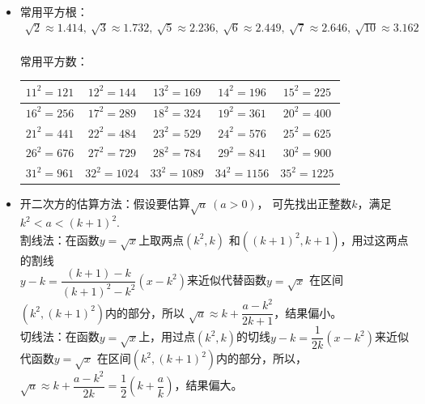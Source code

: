 \begin{itemize}[leftmargin=\inteval{\myitemleftmargin}pt,itemsep=
   \inteval{\myitemitempsep}pt,topsep=\inteval{\myitemtopsep}pt]
\item 常用平方根：
\begin{gather*}
    \sqrt{2}\approx1.414,\ \sqrt{3}\approx1.732,\ \sqrt{5}\approx2.236,\ 
    \sqrt{6}\approx2.449,\ \sqrt{7}\approx2.646,\ \sqrt{10}\approx3.162
\end{gather*}
\\
常用平方数：
\begin{table}[H]
    \centering
    \begin{tabular}{|c|c|c|c|c|}
        \hline
        $ 11^2=121 $ & $ 12^2=144 $ & $ 13^2=169 $ & $ 14^2=196 $ & $ 15^2=225 $\\ \hline
        $ 16^2=256 $ & $ 17^2=289 $ & $ 18^2=324 $ & $ 19^2=361 $ & $ 20^2=400 $\\ \hline
        $ 21^2=441 $ & $ 22^2=484 $ & $ 23^2=529 $ & $ 24^2=576 $ & $ 25^2=625 $\\ \hline
        $ 26^2=676 $ & $ 27^2=729 $ & $ 28^2=784 $ & $ 29^2=841 $ & $ 30^2=900 $\\ \hline
        $ 31^2=961 $ & $ 32^2=1024 $ & $ 33^2=1089 $ & $ 34^2=1156 $ & $ 35^2=1225 $\\ \hline
    \end{tabular}
\end{table}
\item 开二次方的估算方法：假设要估算$ \sqrt{a}\ (a>0) $，
可先找出正整数$ k $，满足$ k^2<a<(k+1)^2 $. \\
割线法：在函数$ y=\sqrt{x} $上取两点$ (k^2,k) $
和$ ((k+1)^2,k+1) $，用过这两点的割线\\ $ y-k=\dfrac{
    (k+1)-k}{(k+1)^2-k^2}(x-k^2) $来近似代替函数$ y=\sqrt{x} $
在区间$ (k^2,(k+1)^2) $内的部分，所以
$ \sqrt{a}\approx k+\dfrac{a-k^2}{2k+1} $，结果偏小。 \\
切线法：在函数$ y=\sqrt{x} $上，用过点$ (k^2,k) $的切线$ y-k=\dfrac{1}{2k}(x-k^2) $来近似代函数$ y=\sqrt{x} $
在区间$ (k^2,(k+1)^2) $内的部分，所以，
$ 	\sqrt{a} \approx k+\dfrac{a-k^2}{2k}=
\dfrac{1}{2}\left(k+\dfrac{a}{k}\right) $，结果偏大。 


\end{itemize}
